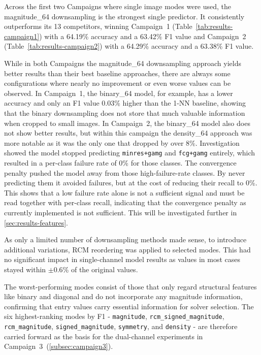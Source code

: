 Across the first two Campaigns where single image modes were used, the magnitude\_64 downsampling is the strongest single predictor.
It consistently outperforms its 13 competitors, winning Campaign~1 (Table~\ref{tab:results-campaign1}) with a 64.19\% accuracy and a 63.42\% F1 value and
Campaign~2 (Table~\ref{tab:results-campaign2}) with a 64.29\% accuracy and a 63.38\% F1 value.

While in both Campaigns the magnitude\_64 downsampling approach yields better results than their best baseline approaches, there are always some
configurations where nearly no improvement or even worse values can be observed.
In Campaign~1, the binary\_64 model, for example, has a lower accuracy and only an F1 value 0.03\% higher than the 1-NN baseline, showing that
the binary downsampling does not store that much valuable information when cropped to small images.
In Campaign~2, the binary\_64 model also does not show better results, but within this campaign the density\_64 approach was more notable as it was the only one
that dropped by over 8\%.
Investigation showed the model stopped predicting \texttt{minres+gamg} and \texttt{fcg+gamg} entirely, which resulted in a per-class failure rate of 0\% for those classes.
The convergence penalty pushed the model away from those high-failure-rate classes.
By never predicting them it avoided failures, but at the cost of reducing their recall to 0\%.
This shows that a low failure rate alone is not a sufficient signal and must be read together with per-class recall, indicating that the convergence penalty as currently implemented is not sufficient. This will be investigated further in \autoref{sec:results-features}.

As only a limited number of downsampling methods made sense, to introduce additional variations, RCM reordering was applied to selected modes.
This had no significant impact in single-channel model results as values in most cases stayed within $\pm 0.6$\% of the original values.

The worst-performing modes consist of those that only regard structural features like binary and diagonal
and do not incorporate any magnitude information, confirming that entry values carry essential information for solver selection.
The six highest-ranking modes by F1 - \texttt{magnitude}, \texttt{rcm\_signed\_magnitude}, \texttt{rcm\_magnitude},
\texttt{signed\_magnitude}, \texttt{symmetry}, and \texttt{density} - are therefore carried forward as the basis
for the dual-channel experiments in Campaign~3~(\autoref{subsec:campaign3}).

